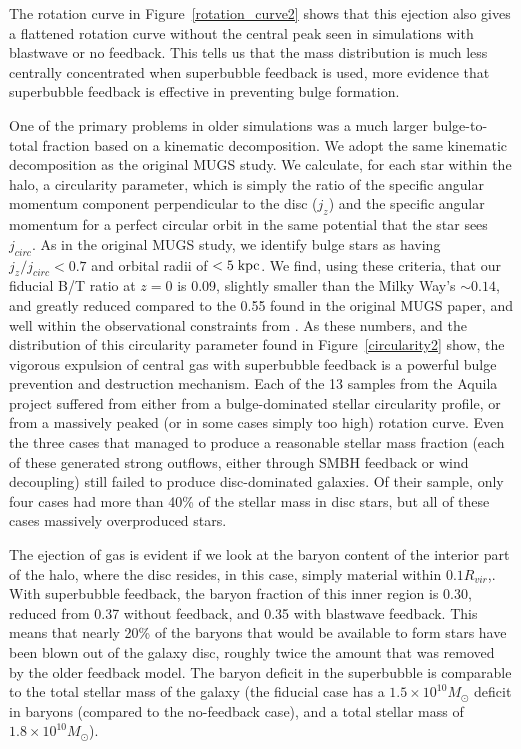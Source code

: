 The rotation curve in Figure~\ref{rotation_curve2} shows that this ejection also
gives a flattened rotation curve without the central peak seen in simulations
with blastwave or no feedback.  This tells us that the mass distribution is much
less centrally concentrated when superbubble feedback is used, more evidence
that superbubble feedback is effective in preventing bulge formation.

One of the primary problems in older simulations was a much larger
bulge-to-total fraction based on a kinematic decomposition.  We adopt the same
kinematic decomposition as the original MUGS study.  We calculate, for each star
within the halo, a circularity parameter, which is simply the ratio of the
specific angular momentum component perpendicular to the disc ($j_z$) and the
specific angular momentum for a perfect circular orbit in the same potential
that the star sees $j_{circ}$.  As in the original MUGS study, we identify bulge
stars as having $j_z/j_{circ} < 0.7$ and orbital radii of $< 5\; \rm{kpc}$.  We
find, using these criteria, that our fiducial B/T ratio at $z=0$ is 0.09,
slightly smaller than the Milky Way's $\sim0.14$, and greatly reduced compared
to the 0.55 found in the original MUGS paper, and well within the observational
constraints from \citet{Allen2006}.  As these numbers, and the distribution of
this circularity parameter found in Figure~\ref{circularity2} show, the vigorous
expulsion of central gas with superbubble feedback is a powerful bulge
prevention and destruction mechanism.  Each of the 13 samples from the Aquila
project \citep{Scannapieco2012} suffered from either from a bulge-dominated
stellar circularity profile, or from a massively peaked (or in some cases simply
too high) rotation curve.  Even the three cases that managed to produce a
reasonable stellar mass fraction (each of these generated strong outflows,
either through SMBH feedback or wind decoupling) still failed to produce
disc-dominated galaxies.  Of their sample, only four cases had more than 40\% of
the stellar mass in disc stars, but all of these cases massively overproduced
stars.

The ejection of gas is evident if we look at the baryon content of the interior
part of the halo, where the disc resides, in this case, simply material within
$0.1R_{vir}$,.  With superbubble feedback, the baryon fraction of this inner
region is 0.30, reduced from 0.37 without feedback, and 0.35 with blastwave
feedback.  This means that nearly 20\% of the baryons that would be available to
form stars have been blown out of the galaxy disc, roughly twice the amount that
was removed by the older feedback model.  The baryon deficit in the superbubble
is comparable to the total stellar mass of the galaxy (the fiducial case has a
$1.5\times 10^{10}M_\odot$ deficit in baryons (compared to the no-feedback
case), and a total stellar mass of $1.8\times 10^{10}M_\odot$).  

